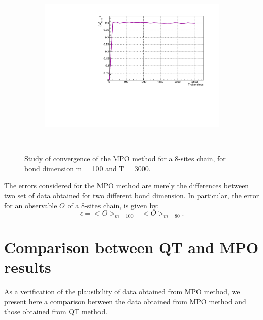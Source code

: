 \begin{figure}[H]
\begin{subfigure}{\columnwidth}
    \includegraphics[scale=0.6]{Figures/convergence/ConvergenceLM_L016_m080_Time002500_J1051.pdf}
    \label{fig:16sites_LMvsGamma}
\end{subfigure}\\
\captionsetup{width=1.\linewidth}
\caption{Study of convergence of the MPO method for a 8-sites chain, for bond dimension m = 100 and T = 3000.}
\label{fig:convergence_8_12_16}
\end{figure}

The errors considered for the MPO method are merely the differences between two set of data obtained for two different bond dimension. In particular, the error for an observable $O$ of a 8-sites chain, is given by:
\begin{equation*}
    \epsilon = <O>_{m=100} - <O>_{m=80}.
\end{equation*}

\section{Comparison between QT and MPO results}
As a verification of the plausibility of data obtained from MPO method, we present here a comparison between the data obtained from MPO method and those obtained from QT method.

